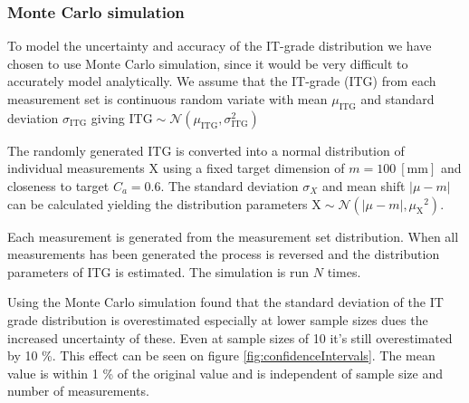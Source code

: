 \documentclass[aip,amsmath, reprint, author-year]{revtex4-1}
\begin{document}
\subsubsection{Monte Carlo simulation}
To model the uncertainty and accuracy of the IT-grade distribution we have chosen to use Monte Carlo simulation, since it would be very difficult to accurately model analytically. 
We assume that the IT-grade (ITG) from each measurement set is continuous random variate with mean $\mu_{\mathrm{ITG}}$ and standard deviation $\sigma_{\mathrm{ITG}}$ giving $\mathrm{ITG} \sim \mathcal{N} (\mu_{\mathrm{ITG}}, \sigma_{\mathrm{ITG}}^2)$

The randomly generated ITG is converted into a normal distribution of individual measurements X using a fixed target dimension of $m = 100 \mathrm{\ [mm]}$ and closeness to target $C_a = 0.6$. 
The standard deviation $\sigma_{X}$ and mean shift $| \mu - m|$ can be calculated yielding the distribution parameters $\mathrm{X} \sim \mathcal{N} (| \mu - m|, {\mu_{\mathrm{X}}}^2)$. 

Each measurement is generated from the measurement set distribution.
When all measurements has been generated the process is reversed and the distribution parameters of ITG is estimated.
The simulation is run $N$ times.

Using the Monte Carlo simulation found that the standard deviation of the IT grade distribution is overestimated especially at lower sample sizes dues the increased uncertainty of these. 
Even at sample sizes of 10 it's still overestimated by 10 \%. 
This effect can be seen on figure \ref{fig:confidenceIntervals}. The mean value is within 1 \% of the original value and is independent of sample size and number of measurements.  
\end{document}

